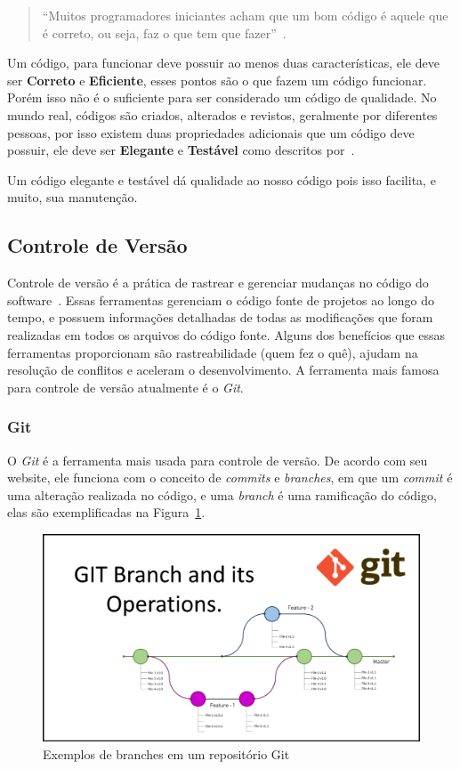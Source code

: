 \documentclass[12pt]{article}
\begin{document}
\begin{quote}
  ``Muitos programadores iniciantes acham que um bom código é aquele que é correto, ou seja, faz o que tem
  que fazer''~\cite{Levy04}.
\end{quote}

Um código, para funcionar deve possuir ao menos duas características, ele deve ser \textbf{Correto} e \textbf{Eficiente},
esses pontos são o que fazem um código funcionar. Porém isso não é o suficiente para ser considerado
um código de qualidade. No mundo real, códigos são criados, alterados e revistos, geralmente por diferentes pessoas,
por isso existem duas propriedades adicionais que um código deve possuir, ele deve ser \textbf{Elegante} e \textbf{Testável}
como descritos por~\cite{Levy04}.

Um código elegante e testável dá qualidade ao nosso código pois isso facilita, e muito, sua manutenção.

\subsection{Controle de Versão}

Controle de versão é a prática de rastrear e gerenciar mudanças no código do software~\cite{attlasianGit}.
Essas ferramentas gerenciam o código fonte de projetos ao longo do tempo, e possuem informações detalhadas
de todas as modificações que foram realizadas em todos os arquivos do código fonte.
Alguns dos benefícios que essas ferramentas proporcionam são rastreabilidade (quem fez o quê),
ajudam na resolução de conflitos e aceleram o desenvolvimento. A ferramenta mais famosa para controle de
versão atualmente é o \textit{Git}.

\subsubsection{Git}

O \textit{Git} é a ferramenta mais usada para controle de versão. De acordo com seu website, ele
funciona com o conceito de \textit{commits} e \textit{branches}, em que um \textit{commit}
é uma alteração realizada no código, e uma \textit{branch} é uma ramificação do código, elas são
exemplificadas na Figura~\ref{fig:git-branches}.

\begin{figure}[H]
  \centering
  \includegraphics[width=1\textwidth]{git/git-branches.png}
  \caption{Exemplos de branches em um repositório Git}\label{fig:git-branches}
\end{figure}
\end{document}
